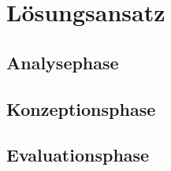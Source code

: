 \chapter{Lösungsansatz}\label{ch:approach}
\section{Analysephase}
\section{Konzeptionsphase}
\section{Evaluationsphase}
